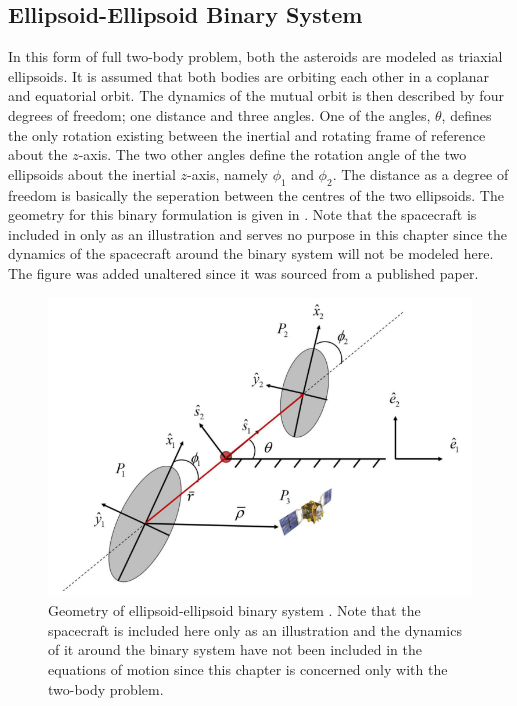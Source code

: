 \subsection{Ellipsoid-Ellipsoid Binary System}
In this form of full two-body problem, both the asteroids are modeled as triaxial ellipsoids. It is assumed that both bodies are orbiting each other in a coplanar and equatorial orbit. The dynamics of the mutual orbit is then described by four degrees of freedom; one distance and three angles. One of the angles, $\theta$, defines the only rotation existing between the inertial and rotating frame of reference about the $z$-axis. The two other angles define the rotation angle of the two ellipsoids about the inertial $z$-axis, namely $\phi_1$ and $\phi_2$. The distance as a degree of freedom is basically the seperation between the centres of the two ellipsoids. The geometry for this binary formulation is given in  \cite{chappaz}. Note that the spacecraft is included in  only as an illustration and serves no purpose in this chapter since the dynamics of the spacecraft around the binary system will not be modeled here. The figure was added unaltered since it was sourced from a published paper.
%
\begin{figure}[h]
\centering
\captionsetup{justification=centering}
\includegraphics[scale=0.7]{ee.png}
\caption{Geometry of ellipsoid-ellipsoid binary system \cite{chappaz}. Note that the spacecraft is included here only as an illustration and the dynamics of it around the binary system have not been included in the equations of motion since this chapter is concerned only with the two-body problem.}
\label{fig:ee}
\end{figure}
